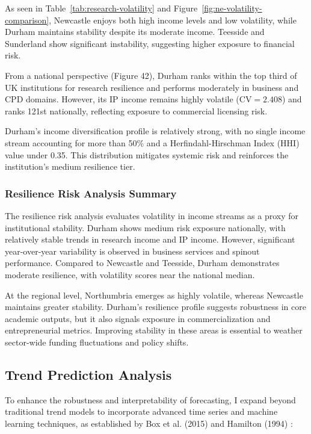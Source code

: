 \documentclass[journal,onecolumn, 10pt,draftclsnofoot]{IEEEtran}
\begin{document}
As seen in Table~\ref{tab:research-volatility} and Figure~\ref{fig:ne-volatility-comparison}, Newcastle enjoys both high income levels and low volatility, while Durham maintains stability despite its moderate income. Teesside and Sunderland show significant instability, suggesting higher exposure to financial risk.

From a national perspective (Figure 42), Durham ranks within the top third of UK institutions for research resilience and performs moderately in business and CPD domains. However, its IP income remains highly volatile ($\mathrm{CV}=2.408$) and ranks 121st nationally, reflecting exposure to commercial licensing risk.

Durham's income diversification profile is relatively strong, with no single income stream accounting for more than 50\% and a Herfindahl-Hirschman Index (HHI) value under 0.35. This distribution mitigates systemic risk and reinforces the institution's medium resilience tier.

\subsubsection{Resilience Risk Analysis Summary}
The resilience risk analysis evaluates volatility in income streams as a proxy for institutional stability. Durham shows medium risk exposure nationally, with relatively stable trends in research income and IP income. However, significant year-over-year variability is observed in business services and spinout performance. Compared to Newcastle and Teesside, Durham demonstrates moderate resilience, with volatility scores near the national median.

At the regional level, Northumbria emerges as highly volatile, whereas Newcastle maintains greater stability. Durham's resilience profile suggests robustness in core academic outputs, but it also signals exposure in commercialization and entrepreneurial metrics. Improving stability in these areas is essential to weather sector-wide funding fluctuations and policy shifts.

\subsection{Trend Prediction Analysis}
\label{sec:trend-prediction}

To enhance the robustness and interpretability of forecasting, I expand beyond traditional trend models to incorporate advanced time series and machine learning techniques, as established by Box et al. (2015) \cite{box2015time} and Hamilton (1994) \cite{hamilton1994time}:
\end{document}

